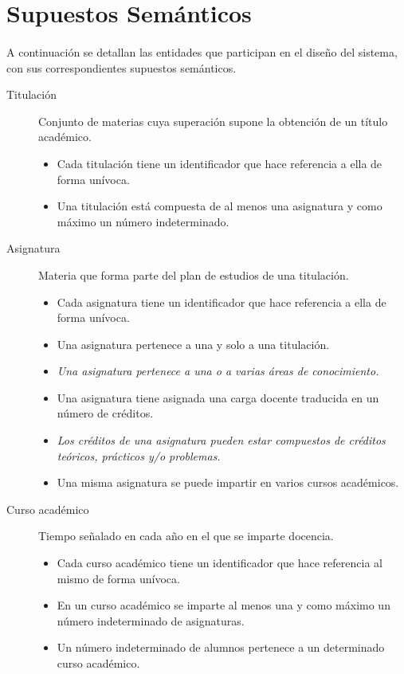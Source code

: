\section{Supuestos Semánticos}

   \paragraph{}A continuación se detallan las entidades que participan en el
   diseño del sistema, con sus correspondientes supuestos semánticos.

   \begin{description}

      \item[Titulación] Conjunto de materias cuya superación supone la obtención
      de un título académico.
      \begin{itemize}
         \item Cada titulación tiene un identificador que hace referencia a ella
          de forma unívoca.
          \item Una titulación está compuesta de al menos una asignatura y como
         máximo un número indeterminado.
      \end{itemize}

      \item[Asignatura] Materia que forma parte del plan de estudios de una
      titulación.
      \begin{itemize}
         \item Cada asignatura tiene un identificador que hace referencia a ella
         de forma unívoca.
         \item Una asignatura pertenece a una y solo a una titulación.
         \item \textit{Una asignatura pertenece a una o a varias áreas de
         conocimiento.}
         \item Una asignatura tiene asignada una carga docente traducida en
         un número de créditos.
         \item \textit{Los créditos de una asignatura pueden estar compuestos de
         créditos teóricos, prácticos y/o problemas.}
         \item Una misma asignatura se puede impartir en varios cursos
         académicos.
      \end{itemize}

      \item[Curso académico] Tiempo señalado en cada año en el que se imparte
      docencia.
      \begin{itemize}
         \item Cada curso académico tiene un identificador que hace referencia
         al mismo de forma unívoca.
         \item En un curso académico se imparte al menos una y como máximo
         un número indeterminado de asignaturas.
         \item Un número indeterminado de alumnos pertenece a un determinado
         curso académico.
      \end{itemize}


\end{description}
